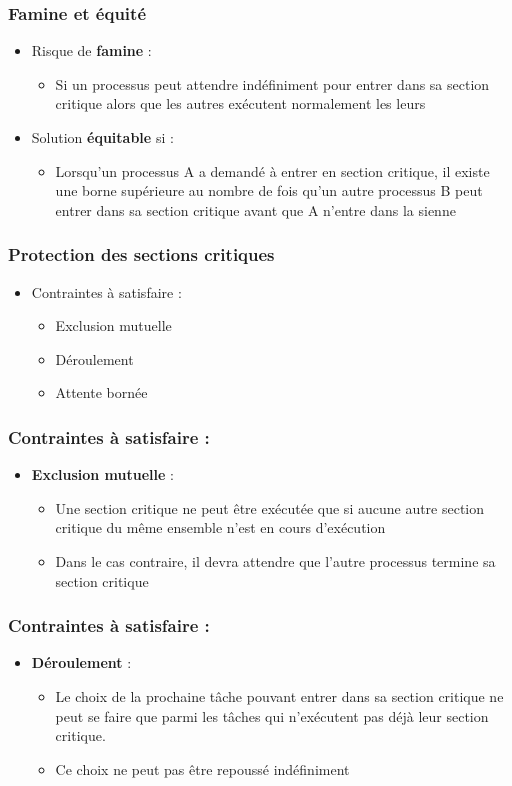 \begin{frame}
\frametitle{Famine et équité}
\begin{itemize}
\item Risque de \textbf{famine} :
\begin{itemize}
\item Si un processus peut attendre indéfiniment pour entrer dans sa section critique alors que les autres exécutent normalement les leurs 
\end{itemize}
\item Solution \textbf{équitable} si :
\begin{itemize}
\item Lorsqu'un processus A a demandé à entrer en section critique, il existe une borne supérieure au nombre de fois qu'un autre processus B peut entrer dans sa section critique avant que A n'entre dans la sienne
\end{itemize}
\end{itemize}
\end{frame}

\begin{frame}
\frametitle{Protection des sections critiques}
\begin{itemize}
\item Contraintes à satisfaire :
\begin{itemize}
\item Exclusion mutuelle
\item Déroulement
\item Attente bornée
\end{itemize}
\end{itemize}
\end{frame}

\begin{frame}
\frametitle{Contraintes à satisfaire :}
\begin{itemize}
\item \textbf{Exclusion mutuelle} : 
\begin{itemize}
\item Une section critique ne peut être exécutée que si aucune autre section critique du même ensemble n'est en cours d'exécution
\item Dans le cas contraire, il devra attendre que l'autre processus termine sa section critique
\end{itemize}
\end{itemize}
\end{frame}

\begin{frame}
\frametitle{Contraintes à satisfaire :}
\begin{itemize}
\item \textbf{Déroulement} :
\begin{itemize}
\item Le choix de la prochaine tâche pouvant entrer dans sa section critique ne peut se faire que parmi les tâches qui n’exécutent pas déjà leur section critique.
\item Ce choix ne peut pas être repoussé indéfiniment
\end{itemize}
\end{itemize}
\end{frame}

